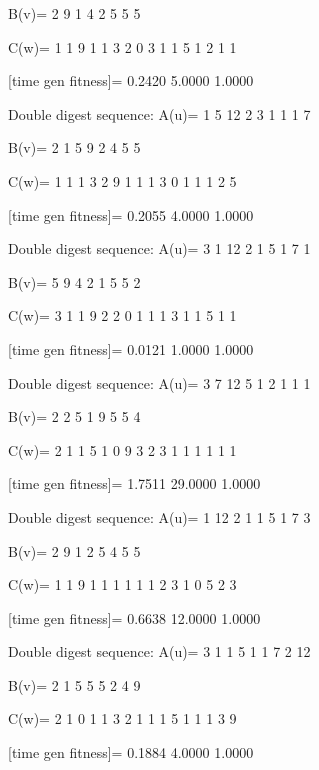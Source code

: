 B(v)=
     2     9     1     4     2     5     5     5

C(w)=
     1     1     9     1     1     3     2     0     3     1     1     5     1     2     1     1

[time gen fitness]=
    0.2420    5.0000    1.0000

Double digest sequence:
A(u)=
     1     5    12     2     3     1     1     1     7

B(v)=
     2     1     5     9     2     4     5     5

C(w)=
     1     1     1     3     2     9     1     1     1     3     0     1     1     1     2     5

[time gen fitness]=
    0.2055    4.0000    1.0000

Double digest sequence:
A(u)=
     3     1    12     2     1     5     1     7     1

B(v)=
     5     9     4     2     1     5     5     2

C(w)=
     3     1     1     9     2     2     0     1     1     1     3     1     1     5     1     1

[time gen fitness]=
    0.0121    1.0000    1.0000

Double digest sequence:
A(u)=
     3     7    12     5     1     2     1     1     1

B(v)=
     2     2     5     1     9     5     5     4

C(w)=
     2     1     1     5     1     0     9     3     2     3     1     1     1     1     1     1

[time gen fitness]=
    1.7511   29.0000    1.0000

Double digest sequence:
A(u)=
     1    12     2     1     1     5     1     7     3

B(v)=
     2     9     1     2     5     4     5     5

C(w)=
     1     1     9     1     1     1     1     1     1     2     3     1     0     5     2     3

[time gen fitness]=
    0.6638   12.0000    1.0000

Double digest sequence:
A(u)=
     3     1     1     5     1     1     7     2    12

B(v)=
     2     1     5     5     5     2     4     9

C(w)=
     2     1     0     1     1     3     2     1     1     1     5     1     1     1     3     9

[time gen fitness]=
    0.1884    4.0000    1.0000

